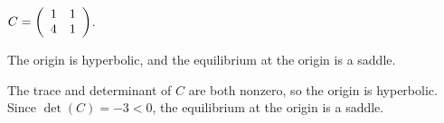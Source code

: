 \documentclass{ximera}
\begin{document}
\begin{exercise}  \label{E:PQg}
$C = \left(\begin{array}{rr} 1 & 1\\ 4 &1\end{array}\right)$.

\begin{solution}
\ans The origin is hyperbolic, and the equilibrium at the origin
is a saddle.

\soln The trace and determinant of $C$ are both nonzero, so the origin
is hyperbolic.  Since $\det(C) = -3 < 0$, the equilibrium at the origin 
is a saddle.

\end{solution}
\end{exercise}
\end{document}
